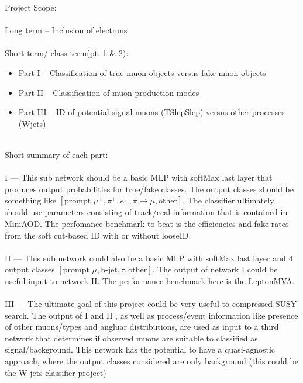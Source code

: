 \documentclass[10pt,a4paper]{article}
\begin{document}
\newpage

Project Scope:\\
\quad \quad \\
Long term -- Inclusion of electrons\\
\quad \quad \\
Short term/ class term(pt. 1 \& 2):\\
\begin{itemize}
\item Part I -- Classification of true muon objects versus fake muon objects
\item Part II -- Classification of muon production modes
\item Part III -- ID of potential signal muons (TSlepSlep) versus other processes (Wjets) 
\end{itemize}
 
 
\quad \quad \\
Short summary of each part:\\

\quad \quad \\
I ---  This sub network should be a basic MLP with softMax last layer that produces output probabilities for true/fake classes. The output classes should be something like $[ \text{prompt}\, \, \mu^\pm, \pi^\pm , e^\pm, \pi\rightarrow \mu, \text{other}]$. The classifier ultimately should use parameters consisting of track/ecal information that is contained in MiniAOD. The perfomance benchmark to beat is the efficiencies and fake rates from the soft cut-based ID with or without looseID.\\
\quad \quad \\
II --- This sub network could also be a basic MLP with softMax last layer and 4 output classes $[\text{prompt} \,\, \mu, \text{b-jet}, \tau, \text{other} ]$. The output of network I could be useful input to network II. The performance benchmark here is the LeptonMVA.\\
\quad \quad \\
III --- The ultimate goal of this project could be very useful to compressed SUSY search. The output of I and II , as well as process/event information like presence of other muons/types and angluar distributions, are used as input to a third network that determines if observed muons are suitable to classified as signal/background. This network has the potential to have a quasi-agnostic approach, where the output classes considered are only background (this could be the W-jets classifier project)\\
 
\end{document}

